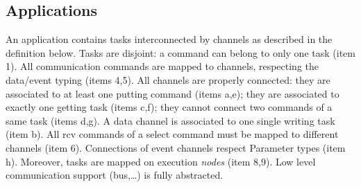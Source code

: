 \documentclass{article}
\begin{document}
\subsection{Applications}
An application contains tasks interconnected by channels as described in the definition below. Tasks are disjoint: a command can belong to only one task (item 1). All communication commands are mapped to channels, respecting the data/event typing (items 4,5). All channels are properly connected: they are associated to at least one putting command (items a,e); they are associated to exactly one getting task (items c,f); they cannot connect two commands of a same task (items d,g). A data channel is associated to one single writing task (item b). All rcv commands of a select command must be mapped to different channels (item 6). Connections of event channels respect Parameter types (item h). Moreover, tasks are mapped on execution {\em nodes} (item 8,9). Low level communication support (bus,\ldots) is fully abstracted.
\end{document}
